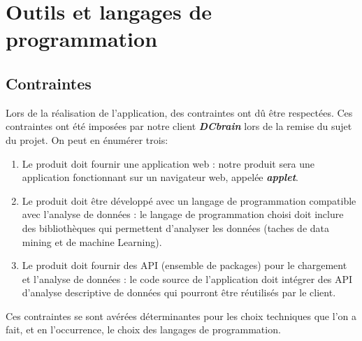 	\section{Outils et langages de programmation}
		\subsection{Contraintes}
		Lors de la réalisation de l'application, des contraintes ont dû être respectées. Ces contraintes ont été imposées par notre client \textbf{\textit{DCbrain}} lors de la remise du sujet du projet. On peut en énumérer trois:
		\begin{enumerate}
			\item Le produit doit fournir une application web : notre produit sera une application fonctionnant sur un navigateur web, appelée \textbf{\textit{applet}}.
			\item Le produit doit être développé avec un langage de programmation compatible avec l'analyse de données : le langage de programmation choisi doit inclure des bibliothèques qui permettent d'analyser les données (taches de data mining et de machine Learning).
			\item Le produit doit fournir des API (ensemble de packages) pour le chargement et l'analyse de données : le code source de l'application doit intégrer des API d'analyse descriptive de données qui pourront être réutilisés par le client.
		\end{enumerate}	
		Ces contraintes se sont avérées déterminantes pour les choix techniques que l'on a fait, et en l'occurrence, le choix des langages de programmation. 
		
